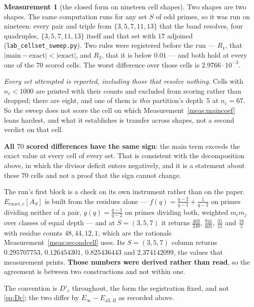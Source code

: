 \documentclass[11pt,a4paper]{article}
\theoremstyle{plain}
\theoremstyle{definition}
\newtheorem{measurement}[theorem]{Measurement}
\theoremstyle{remark}
\begin{document}
\begin{measurement}[the closed form on nineteen cell shapes]\label{meas:sweep}
Two shapes are two shapes. The same computation runs for any set $S$ of
odd primes, so it was run on nineteen: every pair and triple from
$\{3,5,7,11,13\}$ that the band resolves, four quadruples,
$\{3,5,7,11,13\}$ itself and that set with $17$ adjoined
(\texttt{lab\_cellset\_sweep.py}). Two rules were registered before the
run --- $R_1$, that $|\text{main}-\text{exact}|<|\text{exact}|$, and
$R_2$, that it is below $0.01$ --- and both hold at every one of the
$70$ scored cells. The worst difference over those cells is
$2.9766\cdot10^{-3}$.

\emph{Every set attempted is reported, including those that resolve
nothing.} Cells with $n_c<1000$ are printed with their counts and
excluded from scoring rather than dropped; there are eight, and one of
them is \emph{this} partition's depth~$5$ at $n_c=67$. So the sweep does
not score the cell on which Measurement~\ref{meas:maincoef} leans
hardest, and what it establishes is transfer across shapes, not a second
verdict on that cell.

\textbf{All $70$ scored differences have the same sign}: the main term
exceeds the exact value at every cell of every set. That is consistent
with the decomposition above, in which the divisor deficit enters
negatively, and it is a statement about these $70$ cells and not a proof
that the sign cannot change.

The run's first block is a check on its own instrument rather than on
the paper. $E_{\mathrm{exact},c}[A_S]$ is built from the residues alone
--- $f(q)=\frac{q-2}{q-1}+\frac1{q-2}$ on primes dividing neither of a
pair, $g(q)=\frac{q-1}{q-2}$ on primes dividing both, weighted
$m_im_j$ over classes of equal depth --- and at $S=(3,5,7)$ it returns
$\tfrac{403}{240}$, $\tfrac{941}{605}$, $\tfrac{31}{15}$ and
$\tfrac{16}{5}$ with residue counts $48,44,12,1$, which are the
rationals Measurement~\ref{meas:secondcell} uses. Its $S=(3,5,7)$
column returns $0.295707753$, $0.126454301$, $0.825436443$ and
$2.374142099$, the values that measurement prints. \textbf{Those numbers
were derived rather than read}, so the agreement is between two
constructions and not within one.

The convention is $D'_c$ throughout, the form the registration fixed,
and not \eqref{eq:Dc}; the two differ by $E_\infty-E_{\mathrm{all},B}$
as recorded above.
\end{measurement}
\end{document}
